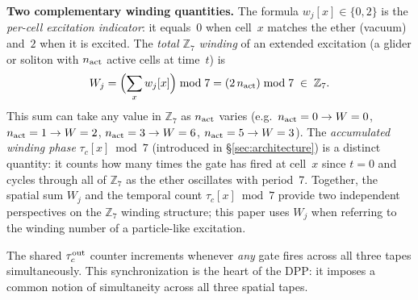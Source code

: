 \documentclass[11pt]{article}
\theoremstyle{remark}
\newcommand{\ZS}{\mathbb{Z}_7}
\newcommand{\tauc}{\tau_c}
\newcommand{\taucout}{\tau_c^{\rm out}}
\begin{document}
\begin{description}[leftmargin=1.2cm]
        \textbf{Two complementary winding quantities.}
        The formula $w_j[x] \in \{0,2\}$ is the
        \emph{per-cell excitation indicator}: it equals~$0$ when cell~$x$
        matches the ether (vacuum) and~$2$ when it is excited.  The
        \emph{total $\ZS$ winding} of an extended excitation (a glider or
        soliton with $n_{\rm act}$ active cells at time~$t$) is
        \[
          W_j = \Bigl(\sum_x w_j[x]\Bigr) \bmod 7
                = (2\,n_{\rm act}) \bmod 7 \;\in\; \ZS.
        \]
        This sum can take any value in $\ZS$ as $n_{\rm act}$ varies (e.g.\
        $n_{\rm act}=0\to W=0$, $n_{\rm act}=1\to W=2$, $n_{\rm act}=3\to
        W=6$, $n_{\rm act}=5\to W=3$).
        The \emph{accumulated winding phase} $\tauc[x]\bmod 7$
        (introduced in \S\ref{sec:architecture}) is a distinct quantity: it
        counts how many times the gate has fired at cell~$x$ since $t=0$ and
        cycles through all of $\ZS$ as the ether oscillates with period~7.
        Together, the spatial sum $W_j$ and the temporal count $\tauc[x]\bmod 7$
        provide two independent perspectives on the $\ZS$ winding structure;
        this paper uses $W_j$ when referring to the winding number of a
        particle-like excitation.
\end{description}

The shared $\taucout$ counter increments whenever \emph{any} gate fires across
all three tapes simultaneously. This synchronization is the heart of the DPP:
it imposes a common notion of simultaneity across all three spatial tapes.
\end{document}
